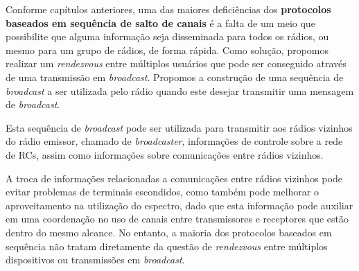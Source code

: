 

Conforme capítulos anteriores, uma das maiores deficiências dos {\bf protocolos baseados em sequência de salto de canais} é a falta de um meio que possibilite que alguma informação seja disseminada para todos os rádios, ou mesmo para um grupo de rádios, de forma rápida. Como solução, propomos realizar um {\it rendezvous} entre múltiplos usuários que pode ser conseguido através de uma transmissão em {\it broadcast}. Propomos a construção de uma sequência de {\it broadcast} a ser utilizada pelo rádio quando este desejar transmitir uma mensagem de {\it broadcast}. %

Esta sequência de {\it broadcast} pode ser utilizada para transmitir aos rádios vizinhos do rádio emissor, chamado de {\it broadcaster}, informações de controle sobre a rede de RCs, assim como informações sobre comunicações entre rádios vizinhos. 

A troca de informações relacionadas a comunicações entre rádios vizinhos pode evitar problemas de terminais escondidos, como também pode melhorar o aproveitamento na utilização do espectro, dado que esta informação pode auxiliar em uma coordenação no uso de canais entre transmissores e receptores que estão dentro do mesmo alcance. No entanto, a maioria dos protocolos baseados em sequência não tratam diretamente da questão de {\it rendezvous} entre múltiplos dispositivos ou transmissões em {\it broadcast}.



